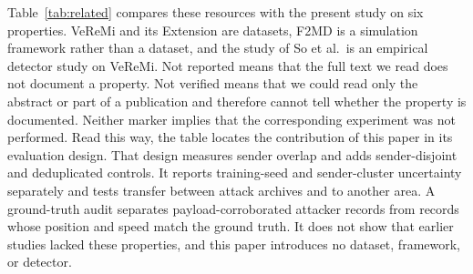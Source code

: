 \documentclass[preprint,12pt,numafflabel]{elsarticle}
\begin{document}
Table~\ref{tab:related} compares these resources with the present study on six properties. VeReMi and its Extension are datasets, F2MD is a simulation framework rather than a dataset, and the study of So et al.\ is an empirical detector study on VeReMi. Not reported means that the full text we read does not document a property. Not verified means that we could read only the abstract or part of a publication and therefore cannot tell whether the property is documented. Neither marker implies that the corresponding experiment was not performed. Read this way, the table locates the contribution of this paper in its evaluation design. That design measures sender overlap and adds sender-disjoint and deduplicated controls. It reports training-seed and sender-cluster uncertainty separately and tests transfer between attack archives and to another area. A ground-truth audit separates payload-corroborated attacker records from records whose position and speed match the ground truth. It does not show that earlier studies lacked these properties, and this paper introduces no dataset, framework, or detector.
\end{document}
